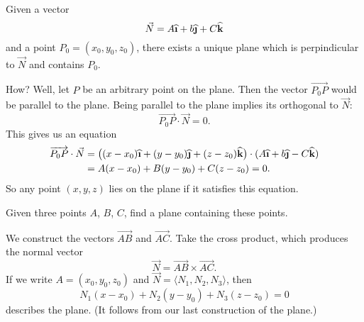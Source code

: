 
Given a vector
\begin{equation}
\vec{N} = A\widehat{\textbf{\i}}+b\widehat{\textbf{\j}}+C\widehat{\textbf{k}}
\end{equation}
and a point $P_{0}=(x_{0},y_{0},z_{0})$, there exists a unique
plane which is perpindicular to $\vec{N}$ and contains $P_{0}$. 

How? Well, let $P$ be an arbitrary point on the plane. Then the
vector $\overrightarrow{P_{0}P}$ would be parallel to the
plane. Being parallel to the plane implies its orthogonal to
$\vec{N}$:
\begin{equation}
\overrightarrow{P_{0}P}\cdot\vec{N}=0.
\end{equation}
This gives us an equation
\begin{equation}
\begin{aligned}
\overrightarrow{P_{0}P}\cdot\vec{N}&=
\bigl(
(x-x_{0})\widehat{\textbf{\i}}+(y-y_{0})\widehat{\textbf{\j}}+(z-z_{0})\widehat{\textbf{k}}
\bigr)\cdot(A\widehat{\textbf{\i}}+b\widehat{\textbf{\j}}-C\widehat{\textbf{k}})
\\
&=A(x-x_{0})+B(y-y_{0})+C(z-z_{0})=0.
\end{aligned}
\end{equation}
So any point $(x,y,z)$ lies on the plane if it satisfies this
equation. 

Given three points $A$, $B$, $C$, find a plane containing these
points. 

We construct the vectors $\overrightarrow{AB}$ and
$\overrightarrow{AC}$. Take the cross product, which produces the
normal vector
\begin{equation}
\vec{N} = \overrightarrow{AB}\times\overrightarrow{AC}.
\end{equation}
If we write $A=(x_{0},y_{0},z_{0})$ and $\vec{N}=\langle
N_{1},N_{2},N_{3}\rangle$, then
\begin{equation}
N_{1}(x-x_{0})+N_{2}(y-y_{0})+N_{3}(z-z_{0}) = 0
\end{equation}
describes the plane. (It follows from our last construction of
the plane.)
